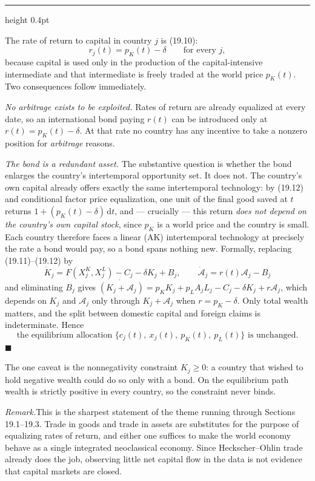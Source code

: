 \documentclass[11pt,letterpaper,reqno]{amsart}
\makeatletter
\newcommand{\dd}{\,\mathrm{d}}
\newcommand{\dt}[1]{\dot{#1}}
\newcommand{\as@head}[3]{%
  \par\addvspace{1.6ex}\penalty-200\relax
  \phantomsection
  \addcontentsline{toc}{subsection}{#1 #2\texorpdfstring{\ifx\relax#3\relax\else\quad #3\fi}{}}%
  {\color{RuleGrey}\hrule height 0.4pt}%
  \nobreak\vspace{0.8ex}\nobreak
  \noindent{\bfseries #1 #2}%
  \ifx\relax#3\relax\else\quad{\bfseries\itshape #3}\fi
  \par\nobreak\vspace{0.4ex}\nobreak
  \as@beginstatement
}
\newcommand{\as@beginstatement}{\begingroup\itshape\ignorespaces}
\newenvironment{aex}[2]{\as@head{Exercise}{#1}{#2}}{\par\addvspace{1.2ex}}
\newcommand{\rmk}[1]{%
  \par\vspace{0.6ex}%
  {\small\noindent\textit{Remark.}\hspace{0.5em}#1\par}%
  \vspace{0.4ex}%
}
\newcommand{\bk}[1]{\textup{\textsc{#1}}}
\renewcommand{\as@beginstatement}{\ignorespaces}
\makeatother
\begin{document}
\begin{aex}{19.8}{}
The rate of return to capital in country $j$ is \bk{(19.10)}:
\[
r_j(t)=p_K(t)-\delta\qquad\text{for every }j ,
\]
because capital is used only in the production of the capital-intensive intermediate and that
intermediate is freely traded at the world price $p_K(t)$.  Two consequences follow immediately.

\emph{No arbitrage exists to be exploited.}  Rates of return are already equalized at every date,
so an international bond paying $r(t)$ can be introduced only at $r(t)=p_K(t)-\delta$.  At that
rate no country has any incentive to take a nonzero position for \emph{arbitrage} reasons.

\emph{The bond is a redundant asset.}  The substantive question is whether the bond enlarges the
country's intertemporal opportunity set.  It does not.  The country's own capital already offers
exactly the same intertemporal technology: by \bk{(19.12)} and conditional factor price
equalization, one unit of the final good saved at $t$ returns $1+ (p_K(t)-\delta)\dd t$, and ---
crucially --- this return \emph{does not depend on the country's own capital stock}, since
$p_K$ is a world price and the country is small.  Each country therefore faces a linear (AK)
intertemporal technology at precisely the rate a bond would pay, so a bond spans nothing new.
Formally, replacing \bk{(19.11)}--\bk{(19.12)} by
\[
\dt K_j=F(X^K_j,X^L_j)-C_j-\delta K_j+B_j,\qquad \dt{\mathcal A}_j=r(t)\mathcal A_j-B_j
\]
and eliminating $B_j$ gives
$\dt{(K_j+\mathcal A_j)}=p_KK_j+p_LA_jL_j-C_j-\delta K_j+r\mathcal A_j$, which depends on
$K_j$ and $\mathcal A_j$ only through $K_j+\mathcal A_j$ when $r=p_K-\delta$.  Only total wealth
matters, and the split between domestic capital and foreign claims is indeterminate.  Hence
\[
\boxed{\ \text{the equilibrium allocation }\{c_j(t),\ x_j(t),\ p_K(t),\ p_L(t)\}
\text{ is unchanged.} \ }
\]
$\blacksquare$

The one caveat is the nonnegativity constraint $K_j\ge0$: a country that wished to hold negative
wealth could do so only with a bond.  On the equilibrium path wealth is strictly positive in every
country, so the constraint never binds.

\rmk{This is the sharpest statement of the theme running through Sections 19.1--19.3.  Trade in
goods and trade in assets are substitutes for the purpose of equalizing rates of return, and
either one suffices to make the world economy behave as a single integrated neoclassical economy.
Since Heckscher--Ohlin trade already does the job, observing little net capital flow in the data
is not evidence that capital markets are closed.}
\end{aex}
\end{document}

